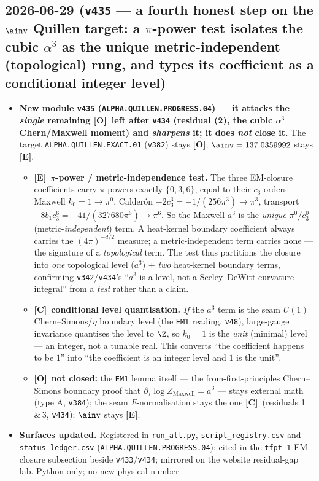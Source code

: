 \documentclass[11pt]{article}
\providecommand{\mE}{\textbf{[E]}}\providecommand{\mC}{\textbf{[C]}}
\providecommand{\mO}{\textbf{[O]}}\providecommand{\mX}{\textbf{[X]}}
\providecommand{\vref}[1]{\texttt{#1}}
\providecommand{\cthree}{c_3}\providecommand{\phiz}{\varphi_0^{\mathrm{ret}}}
\begin{document}
\subsection*{2026-06-29 (\texttt{v435} --- a fourth honest step on the $\ainv$ Quillen target: a $\pi$-power test isolates the cubic $\alpha^3$ as the unique metric-independent (topological) rung, and types its coefficient as a conditional integer level)}
\begin{itemize}
\item \textbf{New module \texttt{v435} (\texttt{ALPHA.QUILLEN.PROGRESS.04}) --- it attacks the \emph{single}
remaining \mO\ left after \vref{v434} (residual (2), the cubic $\alpha^3$ Chern/Maxwell moment) and
\emph{sharpens} it; it does \emph{not} close it.} The target \texttt{ALPHA.QUILLEN.EXACT.01} (\vref{v382})
stays \mO; $\ainv=137.0359992$ stays \mE.
\begin{itemize}
\item \mE\ \textbf{$\pi$-power / metric-independence test.} The three EM-closure coefficients carry
$\pi$-powers exactly $\{0,3,6\}$, equal to their $\cthree$-orders: Maxwell $k_0=1\to\pi^0$, Calder\'on
$-2\cthree^3=-1/(256\pi^3)\to\pi^3$, transport $-8b_1\cthree^6=-41/(327680\pi^6)\to\pi^6$. So the Maxwell
$a^3$ is the \emph{unique} $\pi^0/\cthree^0$ (metric-\emph{independent}) term. A heat-kernel boundary
coefficient always carries the $(4\pi)^{-d/2}$ measure; a metric-independent term carries none --- the
signature of a \emph{topological} term. The test thus partitions the closure into \emph{one} topological
level ($a^3$) $+$ \emph{two} heat-kernel boundary terms, confirming \vref{v342}/\vref{v434}'s ``$a^3$ is a
level, not a Seeley--DeWitt curvature integral'' from a \emph{test} rather than a claim.
\item \mC\ \textbf{conditional level quantisation.} \emph{If} the $a^3$ term is the seam $U(1)$
Chern--Simons/$\eta$ boundary level (the \texttt{EM1} reading, \vref{v48}), large-gauge invariance
quantises the level to $\Z$, so $k_0=1$ is the \emph{unit} (minimal) level --- an integer, not a tunable
real. This converts ``the coefficient happens to be $1$'' into ``the coefficient is an integer level and
$1$ is the unit''.
\item \mO\ \textbf{not closed:} the \texttt{EM1} lemma itself --- the from-first-principles Chern--Simons
boundary proof that $\partial_\tau\log Z_{\mathrm{Maxwell}}=a^3$ --- stays external math (type A, \vref{v384});
the seam $F$-normalisation stays the one \mC\ (residuals 1\,\&\,3, \vref{v434}); $\ainv$ stays \mE.
\end{itemize}
\item \textbf{Surfaces updated.} Registered in \texttt{run\_all.py}, \texttt{script\_registry.csv} and
\texttt{status\_ledger.csv} (\texttt{ALPHA.QUILLEN.PROGRESS.04}); cited in the \texttt{tfpt\_1} EM-closure
subsection beside \vref{v433}/\vref{v434}; mirrored on the website residual-gap lab. Python-only; no new
physical number.
\end{itemize}
\end{document}
